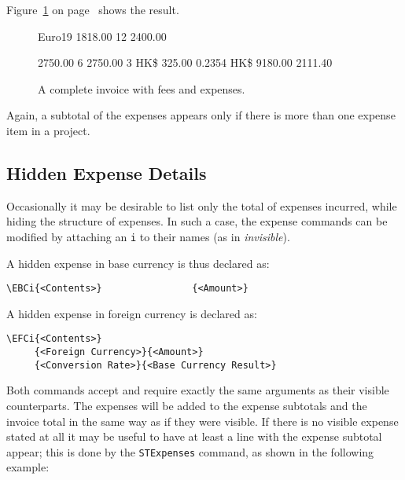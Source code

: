 \documentclass[11pt]{ltxdoc}
\begin{document}
Figure~\ref{full_invoice} on
page~\pageref{full_invoice}
shows the result.

\begin{figure}[h]
\begin{invoice}{Euro}{19}
			{1818.00}	{12}
       		{2400.00}

          {2750.00}   { 6}
           {2750.00}   { 3}
        {HK\$}  {325.00} {0.2354}   {}
              {HK\$}  {9180.00}   {} {2111.40}
\end{invoice}
\caption{A complete invoice with fees and expenses.\label{full_invoice}}
\end{figure}

Again, a subtotal of the expenses appears only if there is more than
one expense item in a project.


\subsection{Hidden Expense Details}

Occasionally it may be desirable to list only the total of expenses
incurred, while hiding the structure of expenses. In such a case,
the expense commands can be modified by attaching an \verb|i| to
their names (as in \textit{invisible}).

A hidden expense in base currency is thus declared as:

\begin{verbatim}
\EBCi{<Contents>}                {<Amount>}
\end{verbatim}

A hidden expense in foreign currency is declared as:

\begin{verbatim}
\EFCi{<Contents>}
     {<Foreign Currency>}{<Amount>}
     {<Conversion Rate>}{<Base Currency Result>}
\end{verbatim}

Both commands accept and require exactly the same arguments as their
visible counterparts. The expenses will be added to the expense subtotals
and the invoice total in the same way as if they were visible. If there
is no visible expense stated at all it may be useful to have at least 
a line with the expense subtotal appear; this is done by the \verb|STExpenses|
command, as shown in the following example:
\end{document}
